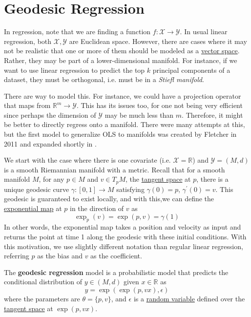 \section{Geodesic Regression}

  In regression, note that we are finding a function $f: \mathcal{X} \to \mathcal{Y}$. In usual linear regression, both $\mathcal{X}, \mathcal{Y}$ are Euclidean space. However, there are cases where it may not be realistic that one or more of them should be modeled as a \hyperref[lin-def:vector-space]{vector space}. Rather, they may be part of a lower-dimensional manifold. For instance, if we want to use linear regression to predict the top $k$ principal components of a dataset, they must be orthogonal, i.e. must be in a \textit{Stiefl manifold}. 

  There are way to model this. For instance, we could have a projection operator that maps from $\mathbb{R}^m \to \mathcal{Y}$. This has its issues too, for one not being very efficient since perhaps the dimension of $\mathcal{Y}$ may be much less than $m$. Therefore, it might be better to directly regress onto a manifold. There were many attempts at this, but the first model to generalize OLS to manifolds was created by Fletcher in 2011 \cite{2011fletcher} and expanded shortly in \cite{2012fletcher}. 

  We start with the case where there is one covariate (i.e. $\mathcal{X} = \mathbb{R}$) and $\mathcal{Y} = (M, d)$ is a smooth Riemannian manifold with a metric. Recall that for a smooth manifold $M$, for any $p \in M$ and $v \in T_p M$, the \hyperref[mv-def:tangent-space]{tangent space} at $p$, there is a unique geodesic curve $\gamma: [0, 1] \to M$ satisfying $\gamma(0) = p$, $\gamma^\prime (0) = v$. This geodesic is guaranteed to exist locally, and with this,we can define the \hyperref[cx-def:exponential-map]{exponential map} at $p$ in the direction of $v$ as 
  \begin{equation}
    \exp_p (v) = \exp(p, v) = \gamma(1)
  \end{equation}
  In other words, the exponential map takes a position and velocity as input and returns the point at time 1 along the geodesic with these initial conditions. With this motivation, we use slightly different notation than regular linear regression, referring $p$ as the bias and $v$ as the coefficient. 

  \begin{definition}
    \label{def:geodesic-regression}
 
    The \textbf{geodesic regression} model is a probabilistic model that predicts the conditional distribution of $y \in (M, d)$ given $x \in \mathbb{R}$ as 
    \begin{equation}
      y = \exp(\exp(p, vx), \epsilon)
    \end{equation} 
    where the parameters are $\theta = \{p, v\}$, and $\epsilon$ is a \hyperref[prob-def:random-variable]{random variable} defined over the \hyperref[mv-def:tangent-space]{tangent space} at $\exp(p, vx)$. 
  \end{definition} 

